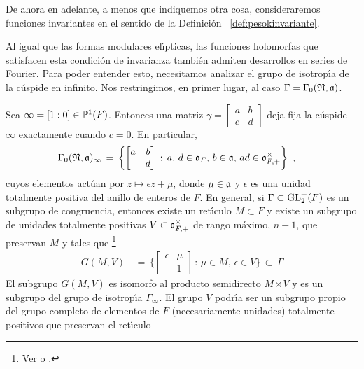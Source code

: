 De ahora en adelante, a menos que indiquemos otra cosa, consideraremos
funciones invariantes en el sentido de la Definici\'{o}n~%
\ref{def:pesokinvariante}.

Al igual que las formas modulares el\'{\i}pticas, las funciones
holomorfas que satisfacen esta condici\'{o}n de invarianza tambi\'{e}n
admiten desarrollos en series de Fourier. Para poder entender esto, necesitamos
analizar el grupo de isotrop\'{\i}a de la c\'{u}spide en infinito. Nos
restringimos, en primer lugar, al caso $\Gamma=\Gamma_{0}(\frak{N},\frak{a})$.

Sea $\infty=[1:0]\in\bb{P}^{1}(F)$. Entonces una matriz
\begin{math}
	\gamma=\left[\begin{smallmatrix} a & b \\
		c & d \end{smallmatrix}\right]
\end{math}
deja fija la c\'{u}spide $\infty$ exactamente cuando $c=0$. En particular,
\begin{align*}
	\Gamma_{0}(\frak{N},\frak{a})_{\infty} & \,=\,\left\lbrace
		\begin{bmatrix} a & b \\ & d \end{bmatrix}\,:\,
		a,\,d\in\oka{F},\,b\in\frak{a},\,ad\in\oka{F,+}^{\times}
		\right\rbrace
	\text{ ,}
\end{align*}
%
cuyos elementos act\'{u}an por $z\mapsto\epsilon z+\mu$, donde $\mu\in\frak{a}$
y $\epsilon$ es una unidad totalmente positiva del anillo de enteros de $F$. En
general, si $\Gamma\subset\GLtp_{2}(F)$ es un subgrupo de congruencia, entonces
existe un ret\'{\i}culo $M\subset F$ y existe un subgrupo de unidades
totalmente positivas $V\subset\oka{F,+}^{\times}$ de rango m\'{a}ximo, $n-1$,
que preservan $M$ y tales que%
\footnote{
	Ver \cite[Ch.~I.3]{FreitagForms} o \cite[Ch.~II.1]{vanDerGeerSurfaces}.
}
\begin{align*}
	G(M,V) & \,=\,\bigg\{\begin{bmatrix}\epsilon & \mu \\ & 1\end{bmatrix}
			\,:\, \mu\in M,\,\epsilon\in V\bigg\}
		\,\subset\,\Gamma
\end{align*}
%
El subgrupo $G(M,V)$ es isomorfo al producto semidirecto $M\rtimes V$ y es un
subgrupo del grupo de isotrop\'{\i}a $\Gamma_{\infty}$. El grupo $V$
podr\'{\i}a ser un subgrupo propio del grupo completo de elementos de $F$
(necesariamente unidades) totalmente positivos que preservan el ret\'{\i}culo
